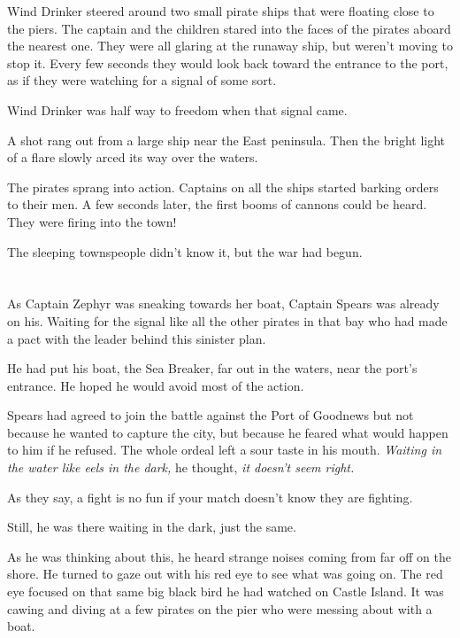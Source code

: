 \documentclass[12pt]{extbook}
\begin{document}
  Wind Drinker steered around two small pirate ships that were floating
  close to the piers. The captain and the children stared into the faces
  of the pirates aboard the nearest one. They were all glaring at the
  runaway ship, but weren't moving to stop it. Every few seconds they
  would look back toward the entrance to the port, as if they were
  watching for a signal of some sort.
  
  Wind Drinker was half way to freedom when that signal came.
  
  A shot rang out from a large ship near the East peninsula. Then the
  bright light of a flare slowly arced its way over the waters.
  
  The pirates sprang into action. Captains on all the ships started
  barking orders to their men. A few seconds later, the first booms of
  cannons could be heard. They were firing into the town!
  
  The sleeping townspeople didn't know it, but the war had begun.
  
  \section{}\label{section-39}
  
  As Captain Zephyr was sneaking towards her boat, Captain Spears was
  already on his. Waiting for the signal like all the other pirates in
  that bay who had made a pact with the leader behind this sinister plan.
  
  He had put his boat, the Sea Breaker, far out in the waters, near the
  port's entrance. He hoped he would avoid most of the action.
  
  Spears had agreed to join the battle against the Port of Goodnews but
  not because he wanted to capture the city, but because he feared what
  would happen to him if he refused. The whole ordeal left a sour taste in
  his mouth. \emph{Waiting in the water like eels in the dark,} he
  thought, \emph{it doesn't seem right.}
  
  As they say, a fight is no fun if your match doesn't know they are
  fighting.
  
  Still, he was there waiting in the dark, just the same.
  
  As he was thinking about this, he heard strange noises coming from far
  off on the shore. He turned to gaze out with his red eye to see what was
  going on. The red eye focused on that same big black bird he had watched
  on Castle Island. It was cawing and diving at a few pirates on the pier
  who were messing about with a boat.
  
\end{document}

